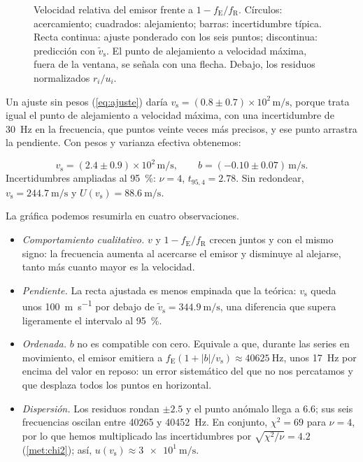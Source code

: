 \documentclass[a4paper,11pt]{amsart}
\numberwithin{equation}{section}
\newcommand{\vs}{v_{\mathrm{s}}}              %
\newcommand{\vst}{\tilde{v}_{\mathrm{s}}}     %
\newcommand{\fE}{f_{\mathrm{E}}}              %
\newcommand{\fR}{f_{\mathrm{R}}}              %
\newcommand{\ext}[1]{U(#1)}                   %
\theoremstyle{cienplano}
\theoremstyle{ciendef}
\theoremstyle{cienobs}
\begin{document}
\begin{figure}[ht]
\caption{Velocidad relativa del emisor frente a $1-\fE/\fR$. Círculos:
acercamiento; cuadrados: alejamiento; barras: incertidumbre típica. Recta
continua: ajuste ponderado con los seis puntos; discontinua: predicción con
$\vst$. El punto de alejamiento a velocidad máxima, fuera de la ventana, se
señala con una flecha. Debajo, los residuos normalizados $r_i/u_i$.}
\label{fig:ajuste1}
\end{figure}

Un ajuste sin pesos (\cref{eq:ajuste}) daría
$\vs=(\num{0,8}\pm\num{0,7})\times10^{2}\,\si{\meter\per\second}$, porque trata
igual el punto de alejamiento a velocidad máxima, con una incertidumbre de
\SI{30}{\hertz} en la frecuencia, que puntos veinte veces más precisos, y ese
punto arrastra la pendiente. Con pesos y varianza efectiva obtenemos:
\begin{destacado}
\vspace{-4pt}
\begin{equation}\label{eq:vsajuste}
  \vs=(\num{2,4}\pm\num{0,9})\times10^{2}\,\si{\meter\per\second},\qquad
  b=(\num{-0,10}\pm\num{0,07})\,\si{\meter\per\second}.
\end{equation}
{\small Incertidumbres ampliadas al \SI{95}{\percent}: $\nu=4$,
$t_{95,4}=\num{2,78}$. Sin redondear, $\vs=\SI{244,7}{\meter\per\second}$ y
$\ext{\vs}=\SI{88,6}{\meter\per\second}$.}
\end{destacado}
La gráfica podemos resumirla en cuatro observaciones.
\begin{itemize}
  \item \emph{Comportamiento cualitativo.} $v$ y $1-\fE/\fR$ crecen juntos y con
    el mismo signo: la frecuencia aumenta al acercarse el emisor y disminuye al
    alejarse, tanto más cuanto mayor es la velocidad.
  \item \emph{Pendiente.} La recta ajustada es menos empinada que la teórica:
    $\vs$ queda unos \SI{100}{\meter\per\second} por debajo de
    $\vst=\SI{344,9}{\meter\per\second}$, una diferencia que supera
    ligeramente el intervalo al \SI{95}{\percent}.
  \item \emph{Ordenada.} $b$ no es compatible con cero. Equivale a que, durante
    las series en movimiento, el emisor emitiera a
    $\fE(1+|b|/\vs)\approx\SI{40625}{\hertz}$, unos \SI{17}{\hertz} por encima
    del valor en reposo: un error sistemático del que no nos percatamos y que desplaza todos los puntos en
    horizontal.
  \item \emph{Dispersión.} Los residuos rondan $\pm\num{2,5}$ y el punto anómalo
    llega a $\num{6,6}$; sus seis frecuencias oscilan entre 40265 y 40452~Hz. En
    conjunto, $\chi^{2}=\num{69}$ para $\nu=4$, por lo que hemos multiplicado las
    incertidumbres por $\sqrt{\chi^{2}/\nu}=\num{4,2}$
    (\cref{met:chi2}); así, $u(\vs)\approx\SI{3e1}{\meter\per\second}$.
\end{itemize}
\end{document}
